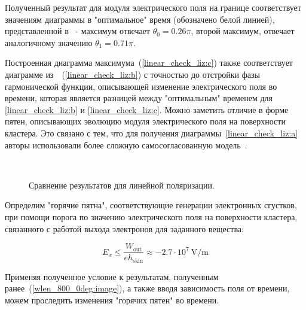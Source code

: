 Полученный результат для модуля электрического поля на границе соответствует значениям диаграммы в "оптимальное" время (обозначено белой линией), представленной в~\cite{liseykina} - максимум отвечает $\theta_0 = 0.26 \pi$, второй максимум, отвечает аналогичному значению $\theta_1 = 0.71 \pi$. 

Построенная диаграмма максимума~(\autoref{linear_check_liz:c}) также соответствует диаграмме из~\cite{liseykina}~(\autoref{linear_check_liz:b}) с точностью до отстройки фазы гармонической функции, описывающей изменение электрического поля во времени, которая является разницей между "оптимальным" временем для \autoref{linear_check_liz:b} и \autoref{linear_check_liz:c}. Можно заметить отличие в форме пятен, описывающих эволюцию модуля электрического поля на поверхности кластера. Это связано с тем, что для получения диаграммы~\autoref{linear_check_liz:a} авторы использовали более сложную самосогласованную модель~\cite{liseykina}.

\begin{figure}[H]
    \hfil
    \\
    \caption{Сравнение результатов для линейной поляризации.}\label{linear_check_liz:image}
\end{figure}

Определим "горячие пятна", соответствующие генерации электронных сгустков, при помощи порога по значению электрического поля на поверхности кластера, связанного с работой выхода электронов для заданного вещества:

    \begin{equation}
        E_x \leq \frac{W_{\textrm{out}}}{e h_{\textrm{skin}}} \approx -2.7 \cdot 10^{7} \:\textrm{V/m}
    \end{equation}

Применяя полученное условие к результатам, полученным ранее~(\autoref{wlen_800_0deg:image}), а также вводя зависимость поля от времени, можем проследить изменения "горячих пятен" во времени.

